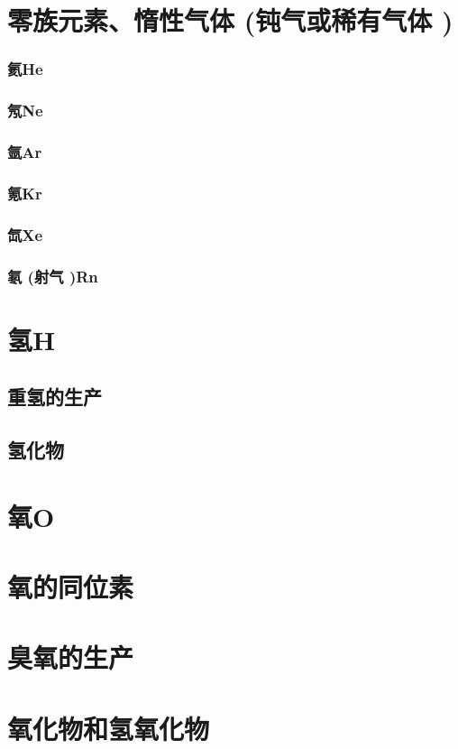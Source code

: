 \documentclass[UTF8]{../03-Chemistry}
\begin{document}
\section{零族元素、惰性气体 (钝气或稀有气体 )}
    \subsubsection{氦He}
    \subsubsection{氖Ne}
    \subsubsection{氩Ar}
    \subsubsection{氪Kr}
    \subsubsection{氙Xe}
    \subsubsection{氡 (射气 )Rn}
\section{氢H}
\subsection{重氢的生产}
\subsection{氢化物}

\section{氧O}
\section{氧的同位素}
\section{臭氧的生产}
\section{氧化物和氢氧化物}
\end{document}

